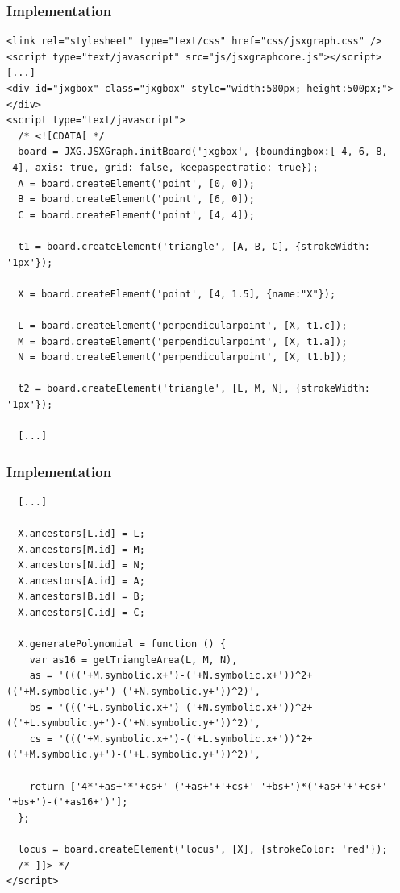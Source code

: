 \documentclass{beamer}
\begin{document}
\begin{frame}[fragile]
  \frametitle{Implementation}

  \begin{block}{}
    \begin{lstlisting}
<link rel="stylesheet" type="text/css" href="css/jsxgraph.css" />
<script type="text/javascript" src="js/jsxgraphcore.js"></script>
[...]
<div id="jxgbox" class="jxgbox" style="width:500px; height:500px;"></div>
<script type="text/javascript">
  /* <![CDATA[ */
  board = JXG.JSXGraph.initBoard('jxgbox', {boundingbox:[-4, 6, 8, -4], axis: true, grid: false, keepaspectratio: true});
  A = board.createElement('point', [0, 0]);
  B = board.createElement('point', [6, 0]);
  C = board.createElement('point', [4, 4]);

  t1 = board.createElement('triangle', [A, B, C], {strokeWidth: '1px'});

  X = board.createElement('point', [4, 1.5], {name:"X"});

  L = board.createElement('perpendicularpoint', [X, t1.c]);
  M = board.createElement('perpendicularpoint', [X, t1.a]);
  N = board.createElement('perpendicularpoint', [X, t1.b]);

  t2 = board.createElement('triangle', [L, M, N], {strokeWidth: '1px'});

  [...]
    \end{lstlisting}
  \end{block}
\end{frame}


\begin{frame}[fragile]
  \frametitle{Implementation}

  \begin{block}{}
    \begin{lstlisting}
  [...]

  X.ancestors[L.id] = L;
  X.ancestors[M.id] = M;
  X.ancestors[N.id] = N;
  X.ancestors[A.id] = A;
  X.ancestors[B.id] = B;
  X.ancestors[C.id] = C;

  X.generatePolynomial = function () {
    var as16 = getTriangleArea(L, M, N),
    as = '((('+M.symbolic.x+')-('+N.symbolic.x+'))^2+(('+M.symbolic.y+')-('+N.symbolic.y+'))^2)',
    bs = '((('+L.symbolic.x+')-('+N.symbolic.x+'))^2+(('+L.symbolic.y+')-('+N.symbolic.y+'))^2)',
    cs = '((('+M.symbolic.x+')-('+L.symbolic.x+'))^2+(('+M.symbolic.y+')-('+L.symbolic.y+'))^2)',

    return ['4*'+as+'*'+cs+'-('+as+'+'+cs+'-'+bs+')*('+as+'+'+cs+'-'+bs+')-('+as16+')'];
  };

  locus = board.createElement('locus', [X], {strokeColor: 'red'});
  /* ]]> */
</script>
    \end{lstlisting}
  \end{block}
\end{frame}
\end{document}
